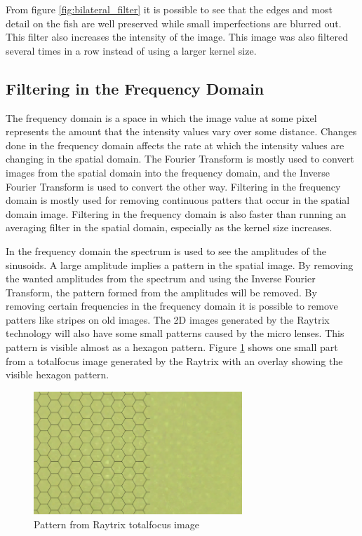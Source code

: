 From figure \ref{fig:bilateral_filter} it is possible to see that the edges and most detail on the fish are well preserved while small imperfections are blurred out. This filter also increases the intensity of the image. This image was also filtered several times in a row instead of using a larger kernel size.




\subsection{Filtering in the Frequency Domain}

The frequency domain is a space in which the image value at some pixel represents the amount that the intensity values vary over some distance. Changes done in the frequency domain affects the rate at which the intensity values are changing in the spatial domain.\cite{website:frequency_domain}
The Fourier Transform is mostly used to convert images from the spatial domain into the frequency domain, and the Inverse Fourier Transform is used to convert the other way. 
Filtering in the frequency domain is mostly used for removing continuous patters that occur in the spatial domain image.
Filtering in the frequency domain is also faster than running an averaging filter in the spatial domain, especially as the kernel size increases.\cite{website:frequency_domain_2}\cite{book:digital_image_processing}

In the frequency domain the spectrum is used to see the amplitudes of the sinusoids. A large amplitude implies a pattern in the spatial image. By removing the wanted amplitudes from the spectrum and using the Inverse Fourier Transform, the pattern formed from the amplitudes will be removed.
By removing certain frequencies in the frequency domain it is possible to remove patters like stripes on old images. The 2D images generated by the Raytrix technology will also have some small patterns caused by the micro lenses. This pattern is visible almost as a hexagon pattern.
Figure \ref{fig:hexagon_pattern} shows one small part from a totalfocus image generated by the Raytrix with an overlay showing the visible hexagon pattern.

\begin{figure}[h]
    \centering
    \includegraphics[width=0.7\textwidth]{images/literature/filtering/pattern_totalfocus}
    \caption{Pattern from Raytrix totalfocus image}
    \label{fig:hexagon_pattern}
\end{figure}

